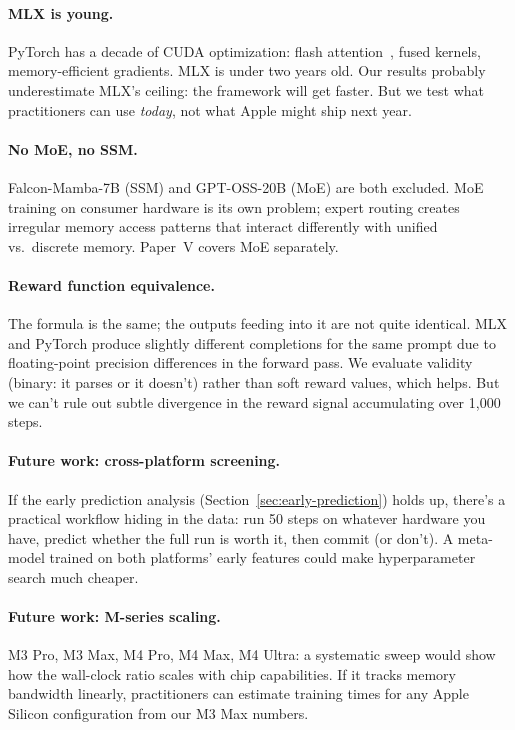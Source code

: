 \documentclass[11pt]{article}
\begin{document}
\paragraph{MLX is young.}
PyTorch has a decade of CUDA optimization: flash attention~\citep{dao2023flashattention2}, fused kernels, memory-efficient gradients.  MLX is under two years old.  Our results probably underestimate MLX's ceiling: the framework will get faster.  But we test what practitioners can use \emph{today}, not what Apple might ship next year.

\paragraph{No MoE, no SSM.}
Falcon-Mamba-7B (SSM) and GPT-OSS-20B (MoE) are both excluded.  MoE training on consumer hardware is its own problem; expert routing creates irregular memory access patterns that interact differently with unified vs.\ discrete memory.  Paper~V covers MoE separately.

\paragraph{Reward function equivalence.}
The formula is the same; the outputs feeding into it are not quite identical.  MLX and PyTorch produce slightly different completions for the same prompt due to floating-point precision differences in the forward pass.  We evaluate validity (binary: it parses or it doesn't) rather than soft reward values, which helps.  But we can't rule out subtle divergence in the reward signal accumulating over 1{,}000 steps.

\paragraph{Future work: cross-platform screening.}
If the early prediction analysis (Section~\ref{sec:early-prediction}) holds up, there's a practical workflow hiding in the data: run 50 steps on whatever hardware you have, predict whether the full run is worth it, then commit (or don't).  A meta-model trained on both platforms' early features could make hyperparameter search much cheaper.

\paragraph{Future work: M-series scaling.}
M3 Pro, M3 Max, M4 Pro, M4 Max, M4 Ultra: a systematic sweep would show how the wall-clock ratio scales with chip capabilities.  If it tracks memory bandwidth linearly, practitioners can estimate training times for any Apple Silicon configuration from our M3 Max numbers.
\end{document}

